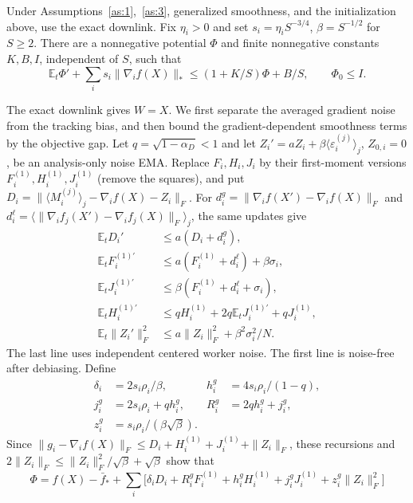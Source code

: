 \begin{codex}
\begin{lemma}\label{lem:nest_general_tracking}
Under Assumptions~\ref{as:1},~\ref{as:3}, generalized smoothness, and the
initialization above, use the exact downlink. Fix
$\eta_i>0$ and set $s_i=\eta_iS^{-3/4}$, $\beta=S^{-1/2}$ for $S\ge2$.
There are a nonnegative potential $\Phi$ and finite nonnegative constants
$K,B,I$, independent of $S$, such that
\[
 \mathbb E_t\Phi'+\sum_i s_i\|\nabla_i f(X)\|_*
 \le(1+K/S)\Phi+B/S,\qquad \Phi_0\le I.
\]
\end{lemma}
\begin{paperproof}
The exact downlink gives $W=X$. We first separate the averaged gradient
noise from the tracking bias, and then bound the gradient-dependent
smoothness terms by the objective gap. Let $q=\sqrt{1-\alpha_D}<1$ and let
$Z_i'=aZ_i+\beta\langle\varepsilon_i^{(j)}\rangle_j$, $Z_{0,i}=0$,
be an analysis-only noise EMA. Replace $F_i,H_i,J_i$ by their first-moment
versions $F_i^{(1)},H_i^{(1)},J_i^{(1)}$ (remove the squares), and put
$D_i=\|\langle M_i^{(j)}\rangle_j-\nabla_i f(X)-Z_i\|_F$.
For $d_i^g=\|\nabla_i f(X')-\nabla_i f(X)\|_F$ and
$d_i^\ell=\langle\|\nabla_i f_j(X')-\nabla_i f_j(X)\|_F\rangle_j$,
the same updates give
\begin{align*}
 \mathbb E_tD_i'&\le a(D_i+d_i^g),\\
 \mathbb E_tF_i^{(1)\prime}&\le a(F_i^{(1)}+d_i^\ell)+\beta\sigma_i,\\
 \mathbb E_tJ_i^{(1)\prime}&\le\beta(F_i^{(1)}+d_i^\ell+\sigma_i),\\
 \mathbb E_tH_i^{(1)\prime}&\le qH_i^{(1)}+
                 2q\mathbb E_tJ_i^{(1)\prime}+qJ_i^{(1)},\\
 \mathbb E_t\|Z_i'\|_F^2&\le a\|Z_i\|_F^2+\beta^2\sigma_i^2/N.
\end{align*}
The last line uses independent centered worker noise. The first line is
noise-free after debiasing. Define
\begin{align*}
 \delta_i&=2s_i\rho_i/\beta,& h_i^g&=4s_i\rho_i/(1-q),\\
 j_i^g&=2s_i\rho_i+qh_i^g,& R_i^g&=2qh_i^g+j_i^g,\\
 z_i^g&=s_i\rho_i/(\beta\sqrt\beta).
\end{align*}
Since $\|g_i-\nabla_i f(X)\|_F\le
D_i+H_i^{(1)}+J_i^{(1)}+\|Z_i\|_F$, these recursions and
$2\|Z_i\|_F\le\|Z_i\|_F^2/\sqrt\beta+\sqrt\beta$ show that
\[
 \Phi=f(X)-\bar f_*+\sum_i\bigl[
 \delta_iD_i+R_i^gF_i^{(1)}+h_i^gH_i^{(1)}
                  +j_i^gJ_i^{(1)}+z_i^g\|Z_i\|_F^2\bigr]
\]
\end{paperproof}
\end{codex}

